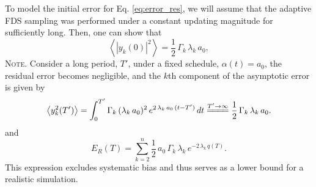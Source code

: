 \documentclass[reprint, superscriptaddress, floatfix]{revtex4-1}
\newcommand{\note}[1]{{\color{DarkGreen}\footnotesize \textsc{Note.} #1}}
\newcommand{\Err}{E}
\begin{document}



%











To model the initial error for Eq. \eqref{eq:error_res},
we will assume that
the adaptive FDS sampling
was performed under a constant updating magnitude
for sufficiently long.
%
Then, one can show that
\begin{equation}
  \left\langle
    \left| y_k(0) \right|^2
  \right\rangle
  = \frac 1 2 \, \Gamma_k \, \lambda_k \, a_0
  ,
  \label{eq:y2_eql}
\end{equation}
%
\note{
Consider a long period, $T'$, under a fixed schedule,
$\alpha(t) = a_0$,
the residual error becomes negligible, and
the $k$th component of the asymptotic error
is given by
%
\begin{align*}
  \left\langle y_k^2(T') \right\rangle
  =
  \int_0^{T'}
    \Gamma_k \, (\lambda_k \, a_0)^2 \,
      e^{ 2 \, \lambda_k \, a_0 \, (t - T') }
    \, dt
  \stackrel{ T' \to \infty }
  { =\joinrel=\joinrel=\joinrel= }
  \frac 1 2 \, \Gamma_k \, \lambda_k \, a_0
  .
\notag
\end{align*}
}
%
and
%
\begin{equation}
  \Err_R(T)
  =
  \sum_{k = 2}^n
      \frac 1 2 \, a_0 \, \Gamma_k \, \lambda_k \,
      e^{  - 2 \, \lambda_k \, q(T) }
  .
  \label{eq:error_res1}
\end{equation}
%
This expression excludes systematic bias
and thus serves as a lower bound for a realistic simulation.
\end{document}
